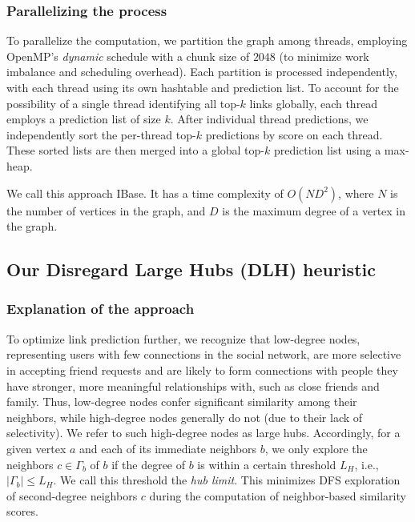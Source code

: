 \subsubsection{Parallelizing the process}

To parallelize the computation, we partition the graph among threads, employing OpenMP's \textit{dynamic} schedule with a chunk size of $2048$ (to minimize work imbalance and scheduling overhead). Each partition is processed independently, with each thread using its own hashtable and prediction list. To account for the possibility of a single thread identifying all top-$k$ links globally, each thread employs a prediction list of size $k$. After individual thread predictions, we independently sort the per-thread top-$k$ predictions by score on each thread. These sorted lists are then merged into a global top-$k$ prediction list using a max-heap.


We call this approach IBase. It has a time complexity of $O(ND^2)$, where $N$ is the number of vertices in the graph, and $D$ is the maximum degree of a vertex in the graph.




\subsection{Our Disregard Large Hubs (DLH) heuristic}

\subsubsection{Explanation of the approach}

To optimize link prediction further, we recognize that low-degree nodes, representing users with few connections in the social network, are more selective in accepting friend requests and are likely to form connections with people they have stronger, more meaningful relationships with, such as close friends and family. Thus, low-degree nodes confer significant similarity among their neighbors, while high-degree nodes generally do not (due to their lack of selectivity). We refer to such high-degree nodes as large hubs. Accordingly, for a given vertex $a$ and each of its immediate neighbors $b$, we only explore the neighbors $c \in \Gamma_b$ of $b$ if the degree of $b$ is within a certain threshold $L_H$, i.e., $|\Gamma_b| \leq L_H$. We call this threshold the \textit{hub limit}. This minimizes DFS exploration of second-degree neighbors $c$ during the computation of neighbor-based similarity scores.

